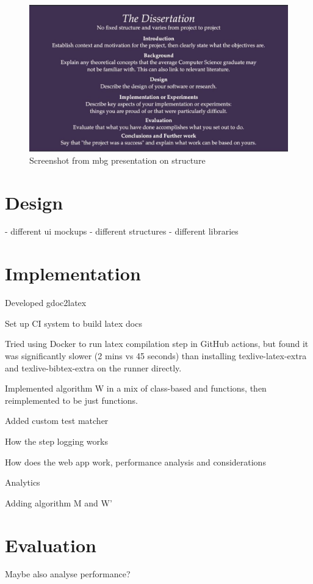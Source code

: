 \documentclass[a4paper,fleqn,12pt]{article}
\begin{document}
\begin{figure}[h!]
  \centering
  \includegraphics[width=1.000\linewidth]{images/image3.jpg}
  \caption{Screenshot from mbg presentation on structure}
\end{figure}

\section{Design}\label{id:h.7ggvdxb04tzm}
- different ui mockups
- different structures
- different libraries
\section{Implementation}\label{id:h.igepudpadp49}
Developed gdoc2latex

Set up CI system to build latex docs

Tried using Docker to run latex compilation step in GitHub actions, but found it was significantly slower (2 mins vs 45 seconds) than installing texlive-latex-extra and texlive-bibtex-extra on the runner directly.

Implemented algorithm W in a mix of class-based and functions, then reimplemented to be just functions.

Added custom test matcher

How the step logging works

How does the web app work, performance analysis and considerations

Analytics

Adding algorithm M and W’
\section{Evaluation}\label{id:h.e6letww4nhn0}
Maybe also analyse performance?
\end{document}
